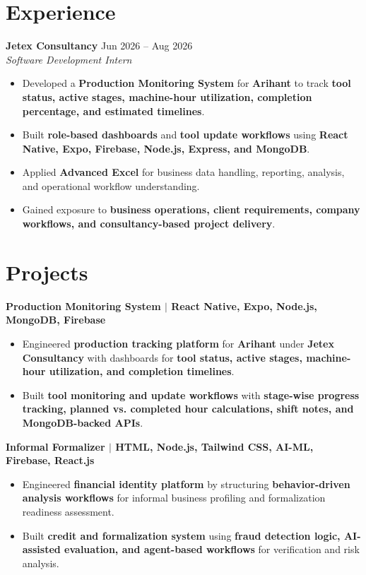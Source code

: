 \documentclass[9pt]{extarticle}
\newcommand{\entry}[4]{
  \textbf{#1} \hfill #2\\
  \textit{#3} \hfill \textit{#4}
}
\newcommand{\project}[2]{
  \textbf{#1} \hfill \textit{#2}
}
\newenvironment{tightitemize}{
  \begin{itemize}[leftmargin=0.14in, itemsep=0pt, topsep=1pt, parsep=0pt, partopsep=0pt]
}{
  \end{itemize}
}
\begin{document}
\section{Experience}
\entry{Jetex Consultancy}{Jun 2026 -- Aug 2026}{Software Development Intern}{}
\begin{tightitemize}
  \item Developed a \textbf{Production Monitoring System} for \textbf{Arihant} to track \textbf{tool status, active stages, machine-hour utilization, completion percentage, and estimated timelines}.
  \item Built \textbf{role-based dashboards} and \textbf{tool update workflows} using \textbf{React Native, Expo, Firebase, Node.js, Express, and MongoDB}.
  \item Applied \textbf{Advanced Excel} for business data handling, reporting, analysis, and operational workflow understanding.
  \item Gained exposure to \textbf{business operations, client requirements, company workflows, and consultancy-based project delivery}.
\end{tightitemize}
\vspace{-5pt}

\section{Projects}
\project{Production Monitoring System $|$ React Native, Expo, Node.js, MongoDB, Firebase}{}
\begin{tightitemize}
  \item Engineered \textbf{production tracking platform} for \textbf{Arihant} under \textbf{Jetex Consultancy} with dashboards for \textbf{tool status, active stages, machine-hour utilization, and completion timelines}.
  \item Built \textbf{tool monitoring and update workflows} with \textbf{stage-wise progress tracking, planned vs. completed hour calculations, shift notes, and MongoDB-backed APIs}.
\end{tightitemize}
\vspace{-2pt}

\project{Informal Formalizer $|$ HTML, Node.js, Tailwind CSS, AI-ML, Firebase, React.js}{}
\begin{tightitemize}
  \item Engineered \textbf{financial identity platform} by structuring \textbf{behavior-driven analysis workflows} for informal business profiling and formalization readiness assessment.
  \item Built \textbf{credit and formalization system} using \textbf{fraud detection logic, AI-assisted evaluation, and agent-based workflows} for verification and risk analysis.
\end{tightitemize}
\vspace{-2pt}
\end{document}
